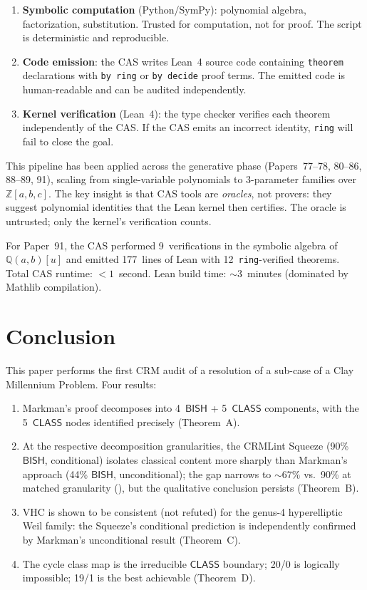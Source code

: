 \documentclass[11pt]{article}
\theoremstyle{plain}
\theoremstyle{definition}
\theoremstyle{remark}
\newcommand{\ZZ}{\mathbb{Z}}
\newcommand{\QQ}{\mathbb{Q}}
\newcommand{\BISH}{\mathsf{BISH}}
\newcommand{\CLASS}{\mathsf{CLASS}}
\begin{document}
\begin{enumerate}[nosep]
\item \textbf{Symbolic computation} (Python/SymPy): polynomial
  algebra, factorization, substitution.  Trusted for computation,
  not for proof.  The script is deterministic and reproducible.
\item \textbf{Code emission}: the CAS writes Lean~4 source code
  containing \texttt{theorem} declarations with \texttt{by ring}
  or \texttt{by decide} proof terms.  The emitted code is
  human-readable and can be audited independently.
\item \textbf{Kernel verification} (Lean~4): the type checker
  verifies each theorem independently of the CAS.  If the CAS emits
  an incorrect identity, \texttt{ring} will fail to close the goal.
\end{enumerate}

This pipeline has been applied across the generative phase
(Papers~77--78, 80--86, 88--89, 91), scaling from single-variable polynomials to 3-parameter
families over $\ZZ[a,b,c]$.  The key insight is that CAS tools are
\emph{oracles}, not provers: they suggest polynomial identities that
the Lean kernel then certifies.  The oracle is untrusted; only the
kernel's verification counts.

For Paper~91, the CAS performed 9~verifications in the symbolic
algebra of $\QQ(a,b)[u]$ and emitted 177~lines of Lean with
12~\texttt{ring}-verified theorems.  Total CAS runtime: $< 1$~second.
Lean build time: ${\sim}3$~minutes (dominated by Mathlib
compilation).

\section{Conclusion}\label{sec:conclusion}

This paper performs the first CRM audit of a resolution of a
sub-case of a Clay Millennium Problem.  Four results:
\begin{enumerate}[label=(\roman*),nosep]
\item Markman's proof decomposes into 4~$\BISH$ + 5~$\CLASS$
  components, with the 5~$\CLASS$ nodes identified precisely
  (Theorem~A).
\item At the respective decomposition granularities, the CRMLint
  Squeeze (90\% $\BISH$, conditional) isolates classical content more
  sharply than Markman's approach (44\% $\BISH$, unconditional); the
  gap narrows to ${\sim}67\%$ vs.\ 90\% at matched granularity
  (), but the qualitative conclusion
  persists (Theorem~B).
\item VHC is shown to be consistent (not refuted) for the genus-4
  hyperelliptic Weil family: the Squeeze's conditional prediction
  is independently confirmed by Markman's unconditional result
  (Theorem~C).
\item The cycle class map is the irreducible $\CLASS$ boundary;
  20/0 is logically impossible; 19/1 is the best achievable
  (Theorem~D).
\end{enumerate}
\end{document}
